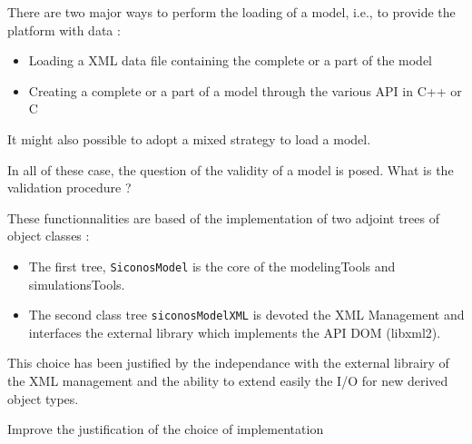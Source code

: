 

There are two major ways  to perform the loading of a model, i.e., to provide  the platform with data :
\begin{itemize}
\item Loading a XML data file containing the complete or a part of the model
\item Creating a complete or a part of a model through the various API in C++ or C
\end{itemize}
It might also possible to adopt a mixed strategy to load a model. 


\begin{ndr}
  In all of these case, the question of the validity of a model is  posed. 
What is the validation procedure ?
\end{ndr}

These functionnalities are based of the implementation of two adjoint trees of object classes :
\begin{itemize}
\item The first tree, \texttt{SiconosModel}  is the core of the modelingTools and simulationsTools.
\item The second class tree \texttt{siconosModelXML} is devoted the XML Management and interfaces the external  library which implements the API DOM (libxml2).
\end{itemize}
This choice has been justified by the independance with  the external librairy of the XML management and the ability to extend easily the I/O for new derived object types.

\begin{ndr}
  Improve the justification of the choice of implementation 
\end{ndr}

